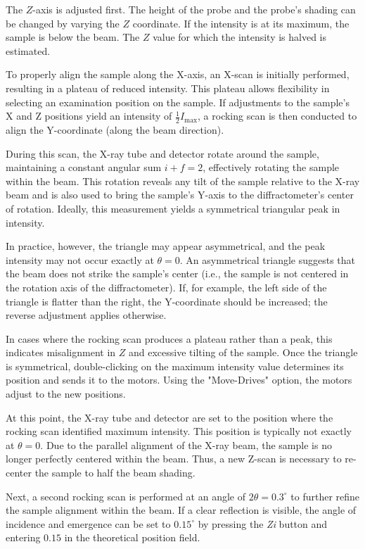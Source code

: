 The $Z$-axis is adjusted first. The height of the probe and the probe's shading can be changed by varying the $Z$ coordinate. If the intensity is at its maximum, the sample is below the beam. The $Z$ value for which the intensity is halved is estimated.

To properly align the sample along the X-axis, an X-scan is initially performed, resulting in a plateau of reduced intensity. This plateau allows flexibility in selecting an examination position on the sample. If adjustments to the sample’s X and Z positions yield an intensity of \( \frac{1}{2} I_{\text{max}} \), a rocking scan is then conducted to align the Y-coordinate (along the beam direction). 

During this scan, the X-ray tube and detector rotate around the sample, maintaining a constant angular sum \( i + f = 2 \), effectively rotating the sample within the beam. This rotation reveals any tilt of the sample relative to the X-ray beam and is also used to bring the sample's Y-axis to the diffractometer's center of rotation. Ideally, this measurement yields a symmetrical triangular peak in intensity. 

In practice, however, the triangle may appear asymmetrical, and the peak intensity may not occur exactly at \( \theta = 0 \). An asymmetrical triangle suggests that the beam does not strike the sample’s center (i.e., the sample is not centered in the rotation axis of the diffractometer). If, for example, the left side of the triangle is flatter than the right, the Y-coordinate should be increased; the reverse adjustment applies otherwise.

In cases where the rocking scan produces a plateau rather than a peak, this indicates misalignment in \( Z \) and excessive tilting of the sample. Once the triangle is symmetrical, double-clicking on the maximum intensity value determines its position and sends it to the motors. Using the "Move-Drives" option, the motors adjust to the new positions.

At this point, the X-ray tube and detector are set to the position where the rocking scan identified maximum intensity. This position is typically not exactly at \( \theta = 0 \). Due to the parallel alignment of the X-ray beam, the sample is no longer perfectly centered within the beam. Thus, a new Z-scan is necessary to re-center the sample to half the beam shading.

Next, a second rocking scan is performed at an angle of \( 2\theta = 0.3^\circ \) to further refine the sample alignment within the beam. If a clear reflection is visible, the angle of incidence and emergence can be set to \( 0.15^\circ \) by pressing the \textit{Zi} button and entering \( 0.15 \) in the theoretical position field.

